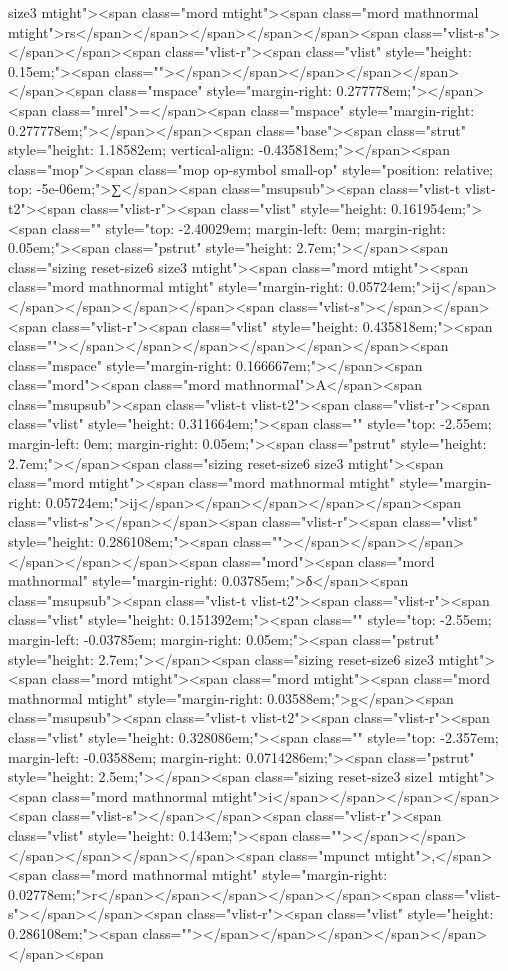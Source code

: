 size3 mtight"><span class="mord mtight"><span class="mord mathnormal mtight">rs</span></span></span></span></span><span class="vlist-s">​</span></span><span class="vlist-r"><span class="vlist" style="height: 0.15em;"><span class=""></span></span></span></span></span></span><span class="mspace" style="margin-right: 0.277778em;"></span><span class="mrel">=</span><span class="mspace" style="margin-right: 0.277778em;"></span></span><span class="base"><span class="strut" style="height: 1.18582em; vertical-align: -0.435818em;"></span><span class="mop"><span class="mop op-symbol small-op" style="position: relative; top: -5e-06em;">∑</span><span class="msupsub"><span class="vlist-t vlist-t2"><span class="vlist-r"><span class="vlist" style="height: 0.161954em;"><span class="" style="top: -2.40029em; margin-left: 0em; margin-right: 0.05em;"><span class="pstrut" style="height: 2.7em;"></span><span class="sizing reset-size6 size3 mtight"><span class="mord mtight"><span class="mord mathnormal mtight" style="margin-right: 0.05724em;">ij</span></span></span></span></span><span class="vlist-s">​</span></span><span class="vlist-r"><span class="vlist" style="height: 0.435818em;"><span class=""></span></span></span></span></span></span><span class="mspace" style="margin-right: 0.166667em;"></span><span class="mord"><span class="mord mathnormal">A</span><span class="msupsub"><span class="vlist-t vlist-t2"><span class="vlist-r"><span class="vlist" style="height: 0.311664em;"><span class="" style="top: -2.55em; margin-left: 0em; margin-right: 0.05em;"><span class="pstrut" style="height: 2.7em;"></span><span class="sizing reset-size6 size3 mtight"><span class="mord mtight"><span class="mord mathnormal mtight" style="margin-right: 0.05724em;">ij</span></span></span></span></span><span class="vlist-s">​</span></span><span class="vlist-r"><span class="vlist" style="height: 0.286108em;"><span class=""></span></span></span></span></span></span><span class="mord"><span class="mord mathnormal" style="margin-right: 0.03785em;">δ</span><span class="msupsub"><span class="vlist-t vlist-t2"><span class="vlist-r"><span class="vlist" style="height: 0.151392em;"><span class="" style="top: -2.55em; margin-left: -0.03785em; margin-right: 0.05em;"><span class="pstrut" style="height: 2.7em;"></span><span class="sizing reset-size6 size3 mtight"><span class="mord mtight"><span class="mord mtight"><span class="mord mathnormal mtight" style="margin-right: 0.03588em;">g</span><span class="msupsub"><span class="vlist-t vlist-t2"><span class="vlist-r"><span class="vlist" style="height: 0.328086em;"><span class="" style="top: -2.357em; margin-left: -0.03588em; margin-right: 0.0714286em;"><span class="pstrut" style="height: 2.5em;"></span><span class="sizing reset-size3 size1 mtight"><span class="mord mathnormal mtight">i</span></span></span></span><span class="vlist-s">​</span></span><span class="vlist-r"><span class="vlist" style="height: 0.143em;"><span class=""></span></span></span></span></span></span><span class="mpunct mtight">,</span><span class="mord mathnormal mtight" style="margin-right: 0.02778em;">r</span></span></span></span></span><span class="vlist-s">​</span></span><span class="vlist-r"><span class="vlist" style="height: 0.286108em;"><span class=""></span></span></span></span></span></span><span 